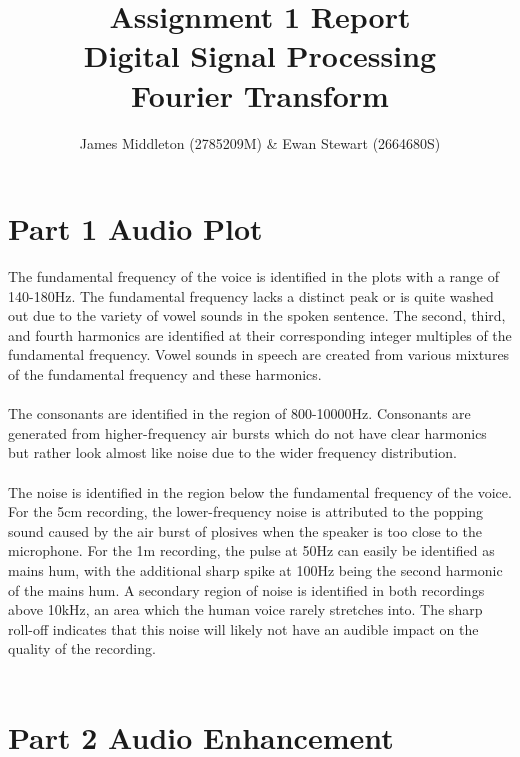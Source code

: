\documentclass[12pt]{extarticle}
\title{Assignment 1 Report \\ Digital Signal Processing \\ Fourier Transform}
\author{James Middleton (2785209M) \& Ewan Stewart (2664680S)}
\date{}
\begin{document}
\maketitle

\section*{Part 1 Audio Plot}


The fundamental frequency of the voice is identified in the plots with a range of 140-180Hz. The fundamental frequency lacks a distinct peak or is quite washed out due to the variety of vowel sounds in the spoken sentence. The second, third, and fourth harmonics are identified at their corresponding integer multiples of the fundamental frequency. Vowel sounds in speech are created from various mixtures of the fundamental frequency and these harmonics.\\\\
The consonants are identified in the region of 800-10000Hz. Consonants are generated from higher-frequency air bursts which do not have clear harmonics but rather look almost like noise due to the wider frequency distribution.\\\\
The noise is identified in the region below the fundamental frequency of the voice. For the 5cm recording, the lower-frequency noise is attributed to the popping sound caused by the air burst of plosives when the speaker is too close to the microphone. For the 1m recording, the pulse at 50Hz can easily be identified as mains hum, with the additional sharp spike at 100Hz being the second harmonic of the mains hum. A secondary region of noise is identified in both recordings above 10kHz, an area which the human voice rarely stretches into. The sharp roll-off indicates that this noise will likely not have an audible impact on the quality of the recording.\\\\

\section*{Part 2 Audio Enhancement}
\end{document}
